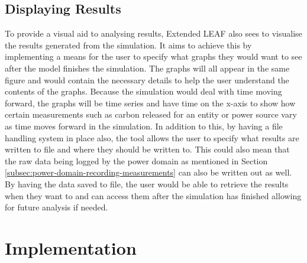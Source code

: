 \documentclass{l4proj}
\begin{document}
\section{Displaying Results}\label{sec:displaying results}
To provide a visual aid to analysing results, Extended LEAF also sees to visualise the results generated from the simulation.
It aims to achieve this by implementing a means for the user to specify what graphs they would want to see after the model finishes the simulation.
The graphs will all appear in the same figure and would contain the necessary details to help the user understand the contents of the graphs.
Because the simulation would deal with time moving forward, the graphs will be time series and have time on the x-axis to show how certain measurements such as carbon released for an entity or power source vary as time moves forward in the simulation.
In addition to this, by having a file handling system in place also, the tool allows the user to specify what results are written to file and where they should be written to.
This could also mean that the raw data being logged by the power domain as mentioned in Section \ref{subsec:power-domain-recording-measurements} can also be written out as well.
By having the data saved to file, the user would be able to retrieve the results when they want to and can access them after the simulation has finished allowing for future analysis if needed.
\chapter{Implementation}
\end{document}
